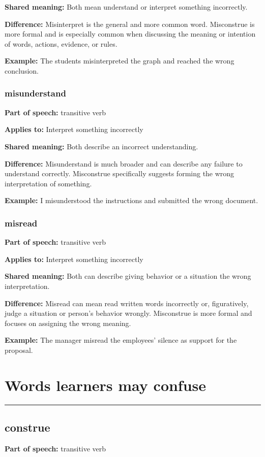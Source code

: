 \documentclass[11pt]{article}
\newcommand{\sectionrule}{\par\vspace{-0.5em}\noindent\textcolor{Accent}{\rule{\linewidth}{0.6pt}}\par}
\begin{document}
\textbf{Shared meaning:} Both mean understand or interpret something incorrectly.

\textbf{Difference:} Misinterpret is the general and more common word. Misconstrue is more formal and is especially common when discussing the meaning or intention of words, actions, evidence, or rules.

\textbf{Example:} The students misinterpreted the graph and reached the wrong conclusion.

\subsubsection{misunderstand}
\textbf{Part of speech:} transitive verb

\textbf{Applies to:} Interpret something incorrectly

\textbf{Shared meaning:} Both describe an incorrect understanding.

\textbf{Difference:} Misunderstand is much broader and can describe any failure to understand correctly. Misconstrue specifically suggests forming the wrong interpretation of something.

\textbf{Example:} I misunderstood the instructions and submitted the wrong document.

\subsubsection{misread}
\textbf{Part of speech:} transitive verb

\textbf{Applies to:} Interpret something incorrectly

\textbf{Shared meaning:} Both can describe giving behavior or a situation the wrong interpretation.

\textbf{Difference:} Misread can mean read written words incorrectly or, figuratively, judge a situation or person's behavior wrongly. Misconstrue is more formal and focuses on assigning the wrong meaning.

\textbf{Example:} The manager misread the employees' silence as support for the proposal.

\section{Words learners may confuse}
\sectionrule
\subsection{construe}
\textbf{Part of speech:} transitive verb
\end{document}
